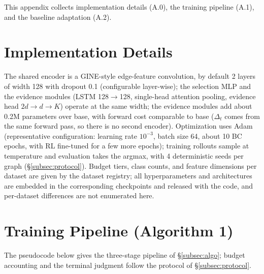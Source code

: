 \documentclass{article}
\begin{document}
\appendix
\renewcommand{\thesection}{A.\arabic{section}}
\setcounter{section}{-1}

This appendix collects implementation details (A.0), the training pipeline (A.1), and the baseline adaptation (A.2).

\section{Implementation Details}
\label{app:impl}

The shared encoder is a GINE-style edge-feature convolution, by default 2 layers of width 128 with dropout 0.1 (configurable layer-wise); the selection MLP and the evidence modules (LSTM 128$\to$128, single-head attention pooling, evidence head $2d{\to}d{\to}K$) operate at the same width; the evidence modules add about 0.2M parameters over base, with forward cost comparable to base ($\Delta_t$ comes from the same forward pass, so there is no second encoder). Optimization uses Adam (representative configuration: learning rate $10^{-3}$, batch size 64, about 10 BC epochs, with RL fine-tuned for a few more epochs); training rollouts sample at temperature and evaluation takes the argmax, with 4 deterministic seeds per graph (\S\ref{subsec:protocol}). Budget tiers, class counts, and feature dimensions per dataset are given by the dataset registry; all hyperparameters and architectures are embedded in the corresponding checkpoints and released with the code, and per-dataset differences are not enumerated here.

\section{Training Pipeline (Algorithm 1)}
\label{app:pipeline}

The pseudocode below gives the three-stage pipeline of \S\ref{subsec:algo}; budget accounting and the terminal judgment follow the protocol of \S\ref{subsec:protocol}.
\end{document}
